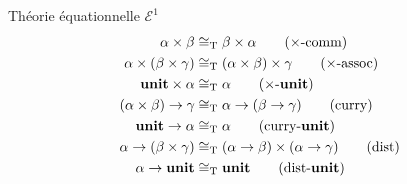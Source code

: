 \documentclass[serif]{beamer}
\newcommand{\unit}{\bold{unit}}
\newcommand{\E}{\mathscr{E}}
\newcommand{\T}{\mathrm{T}}
\begin{document}

\begin{frame}{Théorie équationnelle $\E^1$}
	\begin{align}
			\alpha \times \beta &\cong_\T
			\beta \times \alpha
			\label{prod_comm}
			\tag{$\times$-comm}
		\\
			\alpha \times (\beta \times \gamma) &\cong_\T
			(\alpha \times \beta) \times \gamma
			\label{prod_assoc}
			\tag{$\times$-assoc}
		\\
			\unit \times \alpha &\cong_\T
			\alpha
			\label{prod_unit}
			\tag{$\times$-$\unit$}
		\\
			(\alpha \times \beta) \rightarrow \gamma &\cong_\T
			\alpha \rightarrow (\beta \rightarrow \gamma)
			\label{curry}
			\tag{curry}
		\\
			\unit \rightarrow \alpha &\cong_\T
			\alpha
			\label{curry_unit}
			\tag{curry-$\unit$}
		\\
			\alpha \rightarrow (\beta \times \gamma) &\cong_\T
			(\alpha \rightarrow \beta) \times (\alpha \rightarrow \gamma)
			\label{dist}
			\tag{dist}
		\\
			\alpha \rightarrow \unit &\cong_\T
			\unit
			\label{dist_unit}
			\tag{dist-$\unit$}
	\end{align}
\end{frame}

\end{document}
